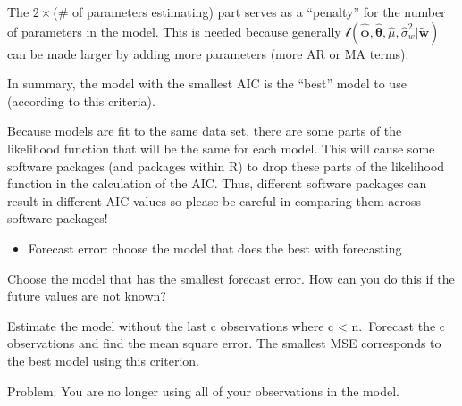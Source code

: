 \documentclass[
]{book}
\providecommand{\tightlist}{%
  \setlength{\itemsep}{0pt}\setlength{\parskip}{0pt}}
\theoremstyle{definition}
\theoremstyle{definition}
\theoremstyle{definition}
\theoremstyle{definition}
\theoremstyle{remark}
\begin{document}
The \(2 \times\)(\# of parameters estimating) part serves as a ``penalty'' for the number of parameters in the model. This is needed because generally \(\mathcal l(\boldsymbol{\hat \phi}, \boldsymbol{\hat \theta}, \hat \mu, \hat \sigma_w^2| \boldsymbol{\tilde w})\) can be made larger by adding more parameters (more AR or MA terms).

In summary, the model with the smallest AIC is the ``best'' model to use (according to this criteria).

Because models are fit to the same data set, there are some parts of the likelihood function that will be the same for each model. This will cause some software packages (and packages within R) to drop these parts of the likelihood function in the calculation of the AIC. Thus, different software packages can result in different AIC values so please be careful in comparing them across software packages!

\begin{itemize}
\tightlist
\item
  Forecast error: choose the model that does the best with forecasting
\end{itemize}

Choose the model that has the smallest forecast error. How can you do this if the future values are not known?

Estimate the model without the last c observations where c \textless{} n.~Forecast the c observations and find the mean square error. The smallest MSE corresponds to the best model using this criterion.

Problem: You are no longer using all of your observations in the model.
\end{document}
